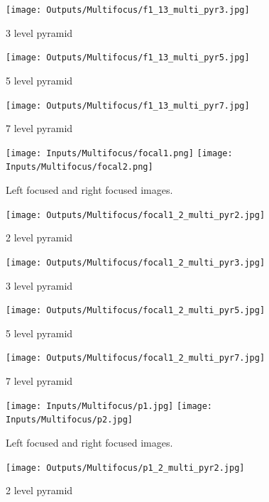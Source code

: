 \documentclass[12pt]{article}
\begin{document}
\begin{figure}[H]
\centering
\texttt{[image: Outputs/Multifocus/f1\_13\_multi\_pyr3.jpg]}
\caption{3 level pyramid}
\end{figure}

\begin{figure}[H]
\centering
\texttt{[image: Outputs/Multifocus/f1\_13\_multi\_pyr5.jpg]}
\caption{5 level pyramid}
\end{figure}

\begin{figure}[H]
\centering
\texttt{[image: Outputs/Multifocus/f1\_13\_multi\_pyr7.jpg]}
\caption{7 level pyramid}
\end{figure}


\begin{figure}[H]
\centering
\texttt{[image: Inputs/Multifocus/focal1.png]}
\texttt{[image: Inputs/Multifocus/focal2.png]}
\caption{Left focused and right focused images.}
\texttt{[image: Outputs/Multifocus/focal1\_2\_multi\_pyr2.jpg]}
\caption{2 level pyramid}

\end{figure}




\begin{figure}[H]
\centering
\texttt{[image: Outputs/Multifocus/focal1\_2\_multi\_pyr3.jpg]}
\caption{3 level pyramid}
\end{figure}

\begin{figure}[H]
\centering
\texttt{[image: Outputs/Multifocus/focal1\_2\_multi\_pyr5.jpg]}
\caption{5 level pyramid}
\end{figure}

\begin{figure}[H]

\centering
\texttt{[image: Outputs/Multifocus/focal1\_2\_multi\_pyr7.jpg]}
\caption{7 level pyramid}
\end{figure}

\begin{figure}[H]

\texttt{[image: Inputs/Multifocus/p1.jpg]}
\texttt{[image: Inputs/Multifocus/p2.jpg]}
\caption{Left focused and right focused images.}

\end{figure}

\begin{figure}[H]
\centering
\texttt{[image: Outputs/Multifocus/p1\_2\_multi\_pyr2.jpg]}
\caption{2 level pyramid}
\end{figure}
\end{document}
